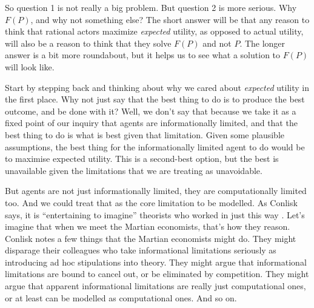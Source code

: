 \documentclass[11pt,]{book}
\begin{document}
So question 1 is not really a big problem. But question 2 is more serious. Why \(F(P)\), and why not something else? The short answer will be that any reason to think that rational actors maximize \emph{expected} utility, as opposed to actual utility, will also be a reason to think that they solve \(F(P)\) and not \(P\). The longer answer is a bit more roundabout, but it helps us to see what a solution to \(F(P)\) will look like.

Start by stepping back and thinking about why we cared about \emph{expected} utility in the first place. Why not just say that the best thing to do is to produce the best outcome, and be done with it? Well, we don't say that because we take it as a fixed point of our inquiry that agents are informationally limited, and that the best thing to do is what is best given that limitation. Given some plausible assumptions, the best thing for the informationally limited agent to do would be to maximise expected utility. This is a second-best option, but the best is unavailable given the limitations that we are treating as unavoidable.

But agents are not just informationally limited, they are computationally limited too. And we could treat that as the core limitation to be modelled. As Conlisk says, it is ``entertaining to imagine'' theorists who worked in just this way \citep[ 691]{Conlisk1996}. Let's imagine that when we meet the Martian economists, that's how they reason. Conlisk notes a few things that the Martian economists might do. They might disparage their colleagues who take informational limitations seriously as introducing ad hoc stipulations into theory. They might argue that informational limitations are bound to cancel out, or be eliminated by competition. They might argue that apparent informational limitations are really just computational ones, or at least can be modelled as computational ones. And so on.
\end{document}
